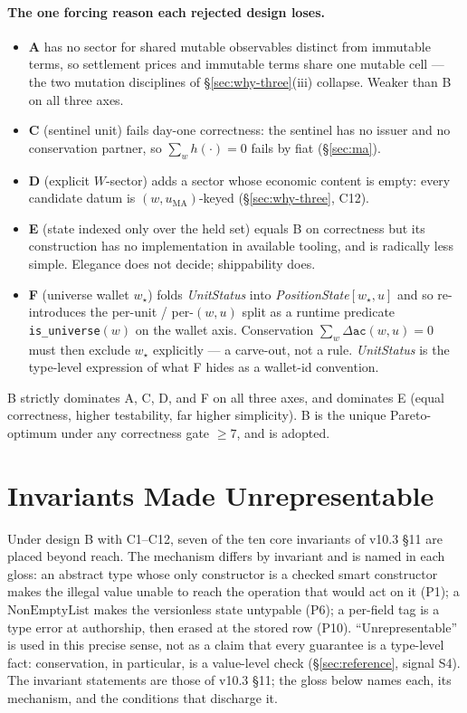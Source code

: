 \documentclass[11pt,a4paper]{article}
\begin{document}
\paragraph{The one forcing reason each rejected design loses.}
\begin{itemize}[leftmargin=*]
\item \textbf{A} has no sector for shared mutable observables distinct from immutable terms,
so settlement prices and immutable terms share one mutable cell --- the two mutation
disciplines of \S\ref{sec:why-three}(iii) collapse. Weaker than B on all three axes.
\item \textbf{C} (sentinel unit) fails day-one correctness: the sentinel has no issuer and
no conservation partner, so $\sum_w h(\cdot)=0$ fails by fiat (\S\ref{sec:ma}).
\item \textbf{D} (explicit $W$-sector) adds a sector whose economic content is empty: every
candidate datum is $(w,u_{\mathrm{MA}})$-keyed (\S\ref{sec:why-three}, C12).
\item \textbf{E} (state indexed only over the held set) equals B on correctness but its
construction has no implementation in available tooling, and is radically less simple.
Elegance does not decide; shippability does.
\item \textbf{F} (universe wallet $w_\star$) folds \emph{UnitStatus} into
\emph{PositionState}$[w_\star,u]$ and so re-introduces the per-unit / per-$(w,u)$ split as a
runtime predicate \texttt{is\_universe}$(w)$ on the wallet axis. Conservation
$\sum_w\Delta\texttt{ac}(w,u)=0$ must then exclude $w_\star$ explicitly --- a carve-out, not
a rule. \emph{UnitStatus} is the type-level expression of what F hides as a wallet-id
convention.
\end{itemize}

\noindent B strictly dominates A, C, D, and F on all three axes, and dominates E (equal
correctness, higher testability, far higher simplicity). B is the unique Pareto-optimum
under any correctness gate $\geq 7$, and is adopted.

\section{Invariants Made Unrepresentable}
\label{sec:unreachable}

Under design B with C1--C12, seven of the ten core invariants of v10.3 \S 11 are placed
beyond reach. The mechanism differs by invariant and is named in each gloss: an abstract type
whose only constructor is a checked smart constructor makes the illegal value unable to reach
the operation that would act on it (P1); a $\mathrm{NonEmptyList}$ makes the versionless state
untypable (P6); a per-field tag is a type error at authorship, then erased at the stored row
(P10). ``Unrepresentable'' is used in this precise sense, not as a claim that every guarantee
is a type-level fact: conservation, in particular, is a value-level check
(\S\ref{sec:reference}, signal S4). The invariant statements are those of v10.3 \S 11; the
gloss below names each, its mechanism, and the conditions that discharge it.
\end{document}
